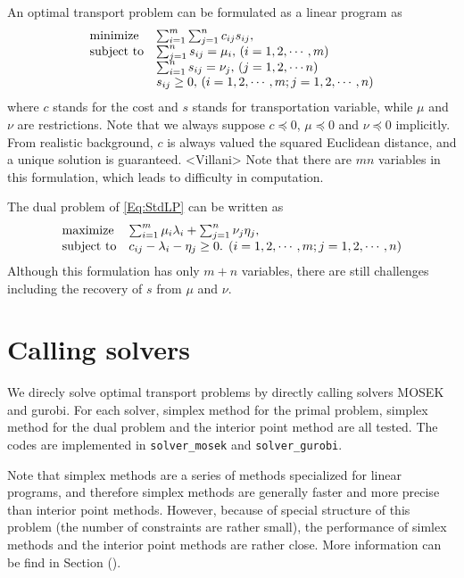 \documentclass[english]{pkupaper}
\begin{document}
An optimal transport problem can be formulated as a linear program as
\begin{equation} \label{Eq:StdLP}
\begin{array}{ll}
\mathrel{\text{{minimize}}} & \sum_{ {i} = {1} }^{m}{\sum_{ {j} = {1} }^{n}{ c_{ i j } s_{ i j } }}, \\
\mathrel{\text{{subject to}}} & \sum_{ {j} = {1} }^{n}{s_{ i j }} = \mu_i, \mathbin{}\left(  i = 1, 2, \cdots, m  \right) \\
& \sum_{ {i} = {1} }^{n}{s_{ i j }} = \nu_j, \mathbin{}\left(  j = 1, 2, \cdots n  \right) \\
& s_{ i j } \ge 0, \mathbin{}\left(  i = 1, 2, \cdots, m; j = 1, 2, \cdots, n  \right)
\end{array}
\end{equation}
where $c$ stands for the cost and $s$ stands for transportation variable, while $\mu$ and $\nu$ are restrictions. Note that we always suppose $ c \preceq 0 $, $ \mu \preceq 0 $ and $ \nu \preceq 0 $ implicitly. From realistic background, $c$ is always valued the squared Euclidean distance, and a unique solution is guaranteed. <Villani> Note that there are $ m n $ variables in this formulation, which leads to difficulty in computation.

The dual problem of \eqref{Eq:StdLP} can be written as 
\begin{equation} \label{Eq:Dual}
\begin{array}{ll}
\mathrel{\text{{maximize}}} & \sum_{ {i} = {1} }^{m}{ \mu_i \lambda_i } + \sum_{ {j} = {1} }^{n}{ \nu_j \eta_j }, \\
\mathrel{\text{{subject to}}} & c_{ i j } - \lambda_i - \eta_j \ge 0. \mathbin{}\left(  i = 1, 2, \cdots, m; j = 1, 2, \cdots, n  \right)
\end{array}
\end{equation}
Although this formulation has only $ m + n $ variables, there are still challenges including the recovery of $s$ from $\mu$ and $\nu$.

\section{Calling solvers}

We direcly solve optimal transport problems by directly calling solvers MOSEK and gurobi. For each solver, simplex method for the primal problem, simplex method for the dual problem and the interior point method are all tested. The codes are implemented in \verb"solver_mosek" and \verb"solver_gurobi".

Note that simplex methods are a series of methods specialized for linear programs, and therefore simplex methods are generally faster and more precise than interior point methods. However, because of special structure of this problem (the number of constraints are rather small), the performance of simlex methods and the interior point methods are rather close. More information can be find in Section ().
\end{document}
